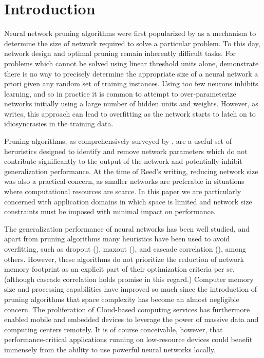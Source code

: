 \section{Introduction}
Neural network pruning algorithms were first popularized by \cite{sietsma1988neural} as a mechanism to determine the size of network required to solve a particular problem. To this day, network design and optimal pruning remain inherently difficult tasks. For problems which cannot be solved using linear threshold units alone, \cite{baum1989size} demonstrate there is no way to precisely determine the appropriate size of a neural network a priori given any random set of training instances. Using too few neurons inhibits learning, and so in practice it is common to attempt to over-parameterize networks initially using a large number of hidden units and weights. However, as \cite{chauvin1990generalization} writes, this approach can lead to overfitting as the network starts to latch on to idiosyncrasies in the training data. 


Pruning algorithms, as comprehensively surveyed by \cite{reed1993pruning}, are a useful set of heruristics designed to identify and remove network parameters which do not contribute significantly to the output of the network and potentially inhibit generalization performance. At the time of Reed's writing, reducing network size was also a practical concern, as smaller networks are preferable in situations where computational resources are scarce. In this paper we are particularly concerned with application domains in which space is limited and network size constraints must be imposed with minimal impact on performance.


The generalization performance of neural networks has been well studied, and apart from pruning algorithms many heuristics have been used to avoid overfitting, such as dropout (\cite{srivastava2014dropout}), maxout (\cite{goodfellow2013maxout}), and cascade correlation (\cite{fahlman1989cascade}), among others. However, these algorithms do not prioritize the reduction of network memory footprint as an explicit part of their optimization criteria per se, (although cascade correlation holds promise in this regard.) Computer memory size and processing capabilities have improved so much since the introduction of pruning algorithms that space complexity has become an almost negligible concern. The proliferation of Cloud-based computing services has furthermore enabled mobile and embedded devices to leverage the power of massive data and computing centers remotely. It is of course conceivable, however, that performance-critical applications running on low-resource devices could benefit immensely from the ability to use powerful neural networks locally. 


